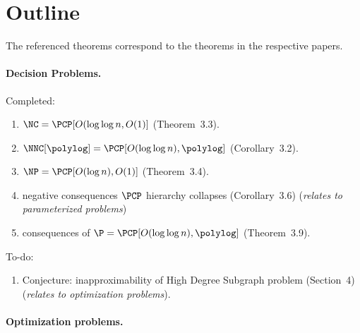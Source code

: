\documentclass[draft]{article}
\begin{document}
\section{Outline}

The referenced theorems correspond to the theorems in the respective papers.

\paragraph{Decision Problems.}
Completed:
\begin{enumerate}
\item $\NC = \PCP[O(\log \log n, O(1)]$ (Theorem~3.3).
\item $\NNC[\polylog] = \PCP[O(\log \log n), \polylog]$ (Corollary~3.2).
\item $\NP = \PCP[O(\log n), O(1)]$ (Theorem~3.4).
\item negative consequences $\PCP$ hierarchy collapses (Corollary~3.6) (\emph{relates to parameterized problems})
\item consequences of $\P = \PCP[O(\log \log n), \polylog]$ (Theorem~3.9).
\end{enumerate}
To-do:
\begin{enumerate}
\item Conjecture: inapproximability of High Degree Subgraph problem (Section~4) (\emph{relates to optimization problems}).
\end{enumerate}

\paragraph{Optimization problems.}
\end{document}
